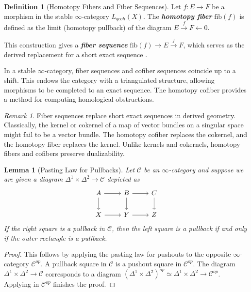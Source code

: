 \documentclass[reqno]{amsart}
\newtheorem{lemma}[theorem]{Lemma}
\theoremstyle{definition}
\newtheorem{definition}[theorem]{Definition}
\theoremstyle{remark}
\newtheorem{remark}[theorem]{Remark}
\newcommand{\bfem}[1]{\textbf{\textit{#1}}}
\begin{document}
\begin{definition}[Homotopy Fibers and Fiber Sequences]
  Let $f: E \to F$ be a morphism in the stable $\infty$-category $L_{qcoh}(X)$.
  The \bfem{homotopy fiber} $\mathrm{fib}(f)$ is defined
  as the limit
  (homotopy pullback) of the diagram $E \xrightarrow{f} F \leftarrow
  0$. 
  
  This construction
  gives a \bfem{fiber sequence} $\mathrm{fib}(f) \to E
  \xrightarrow{f} F$, which
  serves as the derived replacement for a short exact sequence \cite[Section 1.1.2]{LurieHA}.
\end{definition}

In a stable $\infty$-category, fiber sequences and cofiber sequences
coincide up to a shift. This endows the category with a
triangulated structure, allowing morphisms to be completed to
an exact sequence. The homotopy cofiber provides
a method for computing homological obstructions.

\begin{remark}
  Fiber sequences replace short exact sequences in derived geometry.
  Classically, the kernel or cokernel of a map of vector bundles on a
  singular space might fail to be a vector bundle. The homotopy cofiber
  replaces the cokernel, and the homotopy fiber
  replaces the kernel. Unlike kernels and cokernels, homotopy
  fibers and cofibers preserve
  dualizability.
\end{remark}

\begin{lemma}[Pasting Law for Pullbacks]
  \label{lem:pullback_pasting}
  Let $\mathcal{C}$ be an $\infty$-category and suppose we are given a diagram $\Delta^1 \times \Delta^2 \to \mathcal{C}$ depicted as
  \begin{align*}
    \begin{tikzcd}[ampersand replacement=\&]
      A \arrow[r] \arrow[d] \& B \arrow[r] \arrow[d] \& C \arrow[d] \\
      X \arrow[r] \& Y \arrow[r] \& Z
    \end{tikzcd}
  \end{align*}
  If the right square is a pullback in $\mathcal{C}$, then the left square is a pullback if and only if the outer rectangle is a pullback.
\end{lemma}
\begin{proof}
  This follows by applying the pasting law for pushouts \cite[Lemma 4.4.2.1]{LurieHTT} to the opposite $\infty$-category $\mathcal{C}^{op}$. A pullback square in $\mathcal{C}$ is a pushout square in $\mathcal{C}^{op}$. The diagram $\Delta^1 \times \Delta^2 \to \mathcal{C}$ corresponds to a diagram $(\Delta^1 \times \Delta^2)^{op} \simeq \Delta^1 \times \Delta^2 \to \mathcal{C}^{op}$. Applying \cite[Lemma 4.4.2.1]{LurieHTT} in $\mathcal{C}^{op}$ finishes the proof.
\end{proof}
\end{document}
